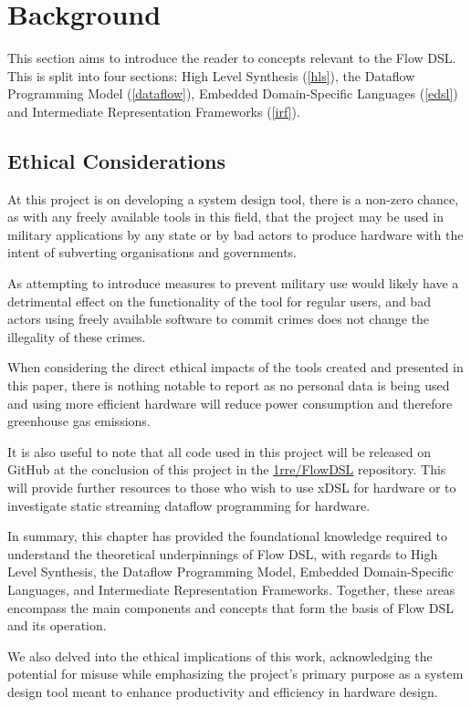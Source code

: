 \chapter{Background}
This section aims to introduce the reader to concepts relevant to the Flow DSL. This is split into four sections: High Level Synthesis (\ref{hls}), the Dataflow Programming Model (\ref{dataflow}), Embedded Domain-Specific Languages (\ref{edsl}) and Intermediate Representation Frameworks (\ref{irf}).









\section{Ethical Considerations}
At this project is on developing a system design tool, there is a non-zero chance, as with any freely available tools in this field, that the project may be used in military applications by any state or by bad actors to produce hardware with the intent of subverting organisations and governments.

As attempting to introduce measures to prevent military use would likely have a detrimental effect on the functionality of the tool for regular users, and bad actors using freely available software to commit crimes does not change the illegality of these crimes.

When considering the direct ethical impacts of the tools created and presented in this paper, there is nothing notable to report as no personal data is being used and using more efficient hardware will reduce power consumption and therefore greenhouse gas emissions.

It is also useful to note that all code used in this project will be released on GitHub at the conclusion of this project in the \href{https://github.com/1rre/FlowDSL}{1rre/FlowDSL} repository. This will provide further resources to those who wish to use xDSL for hardware or to investigate static streaming dataflow programming for hardware.

\par\noindent\hrulefill\par

In summary, this chapter has provided the foundational knowledge required to understand the theoretical underpinnings of Flow DSL, with regards to High Level Synthesis, the Dataflow Programming Model, Embedded Domain-Specific Languages, and Intermediate Representation Frameworks. Together, these areas encompass the main components and concepts that form the basis of Flow DSL and its operation.

We also delved into the ethical implications of this work, acknowledging the potential for misuse while emphasizing the project's primary purpose as a system design tool meant to enhance productivity and efficiency in hardware design.